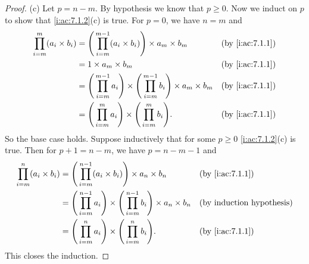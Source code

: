 \begin{proof}{(c)}
  Let \(p = n - m\).
  By hypothesis we know that \(p \geq 0\).
  Now we induct on \(p\) to show that \cref{i:ac:7.1.2}(c) is true.
  For \(p = 0\), we have \(n = m\) and
  \begin{align*}
    \prod_{i = m}^m (a_i \times b_i) & = \Bigg(\prod_{i = m}^{m - 1} (a_i \times b_i)\Bigg) \times a_m \times b_m                                 &  & \by{i:ac:7.1.1} \\
                                     & = 1 \times a_m \times b_m                                                                                  &  & \by{i:ac:7.1.1} \\
                                     & = \Bigg(\prod_{i = m}^{m - 1} a_i\Bigg) \times \Bigg(\prod_{i = m}^{m - 1} b_i\Bigg) \times a_m \times b_m &  & \by{i:ac:7.1.1} \\
                                     & = \Bigg(\prod_{i = m}^m a_i\Bigg) \times \Bigg(\prod_{i = m}^m b_i\Bigg).                                  &  & \by{i:ac:7.1.1}
  \end{align*}
  So the base case holds.
  Suppose inductively that for some \(p \geq 0\) \cref{i:ac:7.1.2}(c) is true.
  Then for \(p + 1 = n - m\), we have \(p = n - m - 1\) and
  \begin{align*}
    \prod_{i = m}^n (a_i \times b_i) & = \Bigg(\prod_{i = m}^{n - 1} (a_i \times b_i)\Bigg) \times a_n \times b_n                                 &  & \by{i:ac:7.1.1} \\
                                     & = \Bigg(\prod_{i = m}^{n - 1} a_i\Bigg) \times \Bigg(\prod_{i = m}^{n - 1} b_i\Bigg) \times a_n \times b_n &  & \byIH           \\
                                     & = \Bigg(\prod_{i = m}^n a_i\Bigg) \times \Bigg(\prod_{i = m}^n b_i\Bigg).                                  &  & \by{i:ac:7.1.1}
  \end{align*}
  This closes the induction.
\end{proof}

